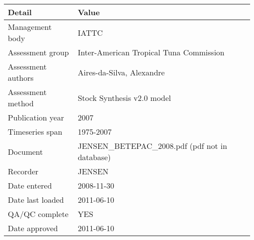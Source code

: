 \begin{table}[htb]
\centering
\begin{tabular}{ll}
\toprule
Detail & Value \\
\midrule
Management body    & IATTC                                           \\
Assessment group   & Inter-American Tropical Tuna Commission         \\
Assessment authors & Aires-da-Silva, Alexandre                       \\
Assessment method  & Stock Synthesis v2.0 model                      \\
Publication year   & 2007                                            \\
Timeseries span    & 1975-2007                                       \\
Document           & JENSEN\_BETEPAC\_2008.pdf (pdf not in database) \\
Recorder           & JENSEN                                          \\
Date entered       & 2008-11-30                                      \\
Date last loaded   & 2011-06-10                                      \\
QA/QC complete     & YES                                             \\
Date approved      & 2011-06-10                                      \\
\bottomrule
\end{tabular}
\label{tab:assessdet}
\end{table}
